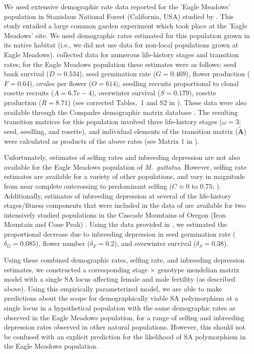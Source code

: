 \documentclass[11pt]{article}
\def\mbf#1{\mathbf{#1}}
\begin{document}
We used extensive demographic rate data reported for the 'Eagle Meadows' population in Stanislaus National Forest (California, USA) studied by \citet{PetersonEtAl2016}. This study entailed a large common garden experiment which took place at the 'Eagle Meadows' site. We used demographic rates estimated for this population grown in its native habitat (i.e., we did not use data for non-local populations grown at Eagle Meadows). \citet{PetersonEtAl2016} collected data for numerous life-history stages and transition rates; for the Eagle Meadows population these estimates were as follows: seed bank survival ($D = 0.534$), seed germination rate ($G = 0.469$), flower production ($F = 0.64$), ovules per flower ($O = 614)$, seedling recruits proportional to clonal rosette recruits ($A = 6.7e-4$), overwinter survival ($S = 0.179$), rosette production ($R = 8.71$) (see corrected Tables.~1 and S2 in \citealt{PetersonEtAl2017}). These data were also available through the Compadre demographic matrix database \citep{CompadreDB2020}. The resulting transition matrices for this population involved three life-history stages ($\omega = 3$; seed, seedling, and rosette), and individual elements of the transition matrix ($\tilde{\mbf{A}}$) were calculated as products of the above rates (see Matrix 1 in \citealt{PetersonEtAl2016}).

Unfortunately, estimates of selfing rates and inbreeding depression are not also available for the Eagle Meadows population of {\itshape M.~guttatus}. However, selfing rate estimates are available for a variety of other populations, and vary in magnitude from near complete outcrossing to predominant selfing ($C \approx 0$ to $0.75$; \citealt{RitlandGanders1987, Ritland1990, Willis1999b}). Additionally, estimates of inbreeding depression at several of the life-history stages/fitness components that were included in the data of \citet{PetersonEtAl2016} are available for two intensively studied populations in the Cascade Mountains of Oregon (Iron Mountain and Cone Peak) \citet{Willis1993, Willis1999a, Willis1999b}. Using the data provided in \citet{Willis1993}, we estimated the proportional decrease due to inbreeding depression in seed germination rate ($\delta_{G} = 0.085$), flower number ($\delta_{F} = 0.2$), and overwinter survival ($\delta_{S} = 0.38$).

Using these combined demographic rates, selfing rate, and inbreeding depression estimates, we constructed a corresponding stage $\times$ genotype mendelian matrix model with a single SA locus affecting female and male fertility (as described above). Using this empirically parameterized model, we are able to make predictions about the scope for demographically viable SA polymorphism at a single locus in a hypothetical population with the same demographic rates as observed in the Eagle Meadows population, for a range of selfing and inbreeding depression rates observed in other natural populations. However, this should not be confused with an explicit prediction for the likelihood of SA polymorphism in the Eagle Meadows population.
\end{document}
